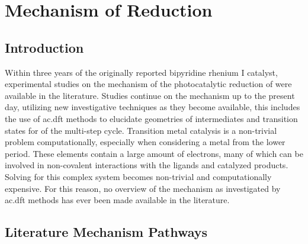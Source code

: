 \chapter{Mechanism of \texorpdfstring{}{CO2} Reduction}\label{chap.mech}

\section{Introduction}

Within three years of the originally reported bipyridine rhenium I catalyst, experimental studies on the mechanism of the photocatalytic reduction of  were available in the literature\autocite{hawecker1986}. Studies continue on the mechanism up to the present day\autocite{koike2002, machan2014}, utilizing new investigative techniques as they become available, this includes the use of \gls{ac.dft} methods to elucidate geometries of intermediates and transition states for of the multi-step cycle. Transition metal catalysis is a non-trivial problem computationally, especially when considering a metal from the lower period. These elements contain a large amount of electrons, many of which can be involved in non-covalent interactions with the ligands and catalyzed products. Solving for this complex system becomes non-trivial and computationally expensive. For this reason, no overview of the mechanism as investigated by \gls{ac.dft} methods has ever been made available in the literature. 

\section{Literature Mechanism Pathways}

